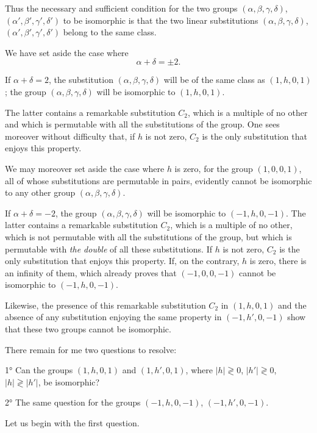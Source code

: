 \documentclass{article}
\begin{document}
Thus the necessary and sufficient condition for the two groups $(\alpha, \beta, \gamma, \delta)$, $(\alpha', \beta', \gamma', \delta')$ to be isomorphic is that the two linear substitutions $(\alpha, \beta, \gamma, \delta)$, $(\alpha', \beta', \gamma', \delta')$ belong to the same class.

We have set aside the case where
\[ \alpha + \delta = \pm 2. \]

If $\alpha + \delta = 2$, the substitution $(\alpha, \beta, \gamma, \delta)$ will be of the same class as $(1, h, 0, 1)$; the group $(\alpha, \beta, \gamma, \delta)$ will be isomorphic to $(1, h, 0, 1)$.

The latter contains a remarkable substitution $C_{2}$, which is a multiple of no other and which is permutable with all the substitutions of the group. One sees moreover without difficulty that, if $h$ is not zero, $C_{2}$ is the only substitution that enjoys this property.

We may moreover set aside the case where $h$ is zero, for the group $(1, 0, 0, 1)$, all of whose substitutions are permutable in pairs, evidently cannot be isomorphic to any other group $(\alpha, \beta, \gamma, \delta)$.

If $\alpha + \delta = -2$, the group $(\alpha, \beta, \gamma, \delta)$ will be isomorphic to $(-1, h, 0, -1)$. The latter contains a remarkable substitution $C_{2}$, which is a multiple of no other, which is not permutable with all the substitutions of the group, but which is permutable with \emph{the double} of all these substitutions. If $h$ is not zero, $C_{2}$ is the only substitution that enjoys this property. If, on the contrary, $h$ is zero, there is an infinity of them, which already proves that $(-1, 0, 0, -1)$ cannot be isomorphic to $(-1, h, 0, -1)$.

Likewise, the presence of this remarkable substitution $C_{2}$ in $(1, h, 0, 1)$ and the absence of any substitution enjoying the same property in $(-1, h', 0, -1)$ show that these two groups cannot be isomorphic.

There remain for me two questions to resolve:

1° Can the groups $(1, h, 0, 1)$ and $(1, h', 0, 1)$, where $|h| \gtrless 0$, $|h'| \gtrless 0$, $|h| \gtrless |h'|$, be isomorphic?

2° The same question for the groups $(-1, h, 0, -1)$, $(-1, h', 0, -1)$.

Let us begin with the first question.
\end{document}
